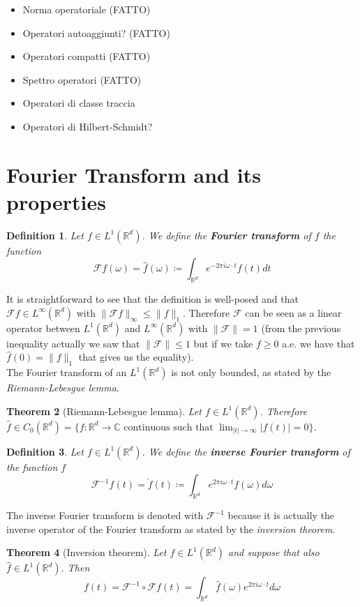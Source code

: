 \documentclass[corpo=11pt, stile=classica, tipotesi=custom,
greek, evenboxes, english]{toptesi}
\numberwithin{equation}{chapter}
\newtheorem{teo}{Theorem}[chapter] %
\newtheorem{defi}[teo]{Definition}
\theoremstyle{remark}
\newcommand{\R}{\mathbb{R}} %
\newcommand{\F}{\mathscr{F}} %
\newcommand{\C}{\mathbb{C}} %
\begin{document}
\begin{itemize}
	\item Norma operatoriale (FATTO)
	\item Operatori autoaggiunti? (FATTO)
	\item Operatori compatti (FATTO)
	\item Spettro operatori (FATTO)
	\item Operatori di classe traccia
	\item Operatori di Hilbert-Schmidt?
\end{itemize}
\section{Fourier Transform and its properties}\label{section Fourier transform and its properties}
\begin{defi}\label{Fourier transform def}
	Let $f \in L^1(\R^d)$. We define the \textbf{Fourier transform} of $f$ the function
	\begin{equation}\label{Fourier transform formula}
		\F f(\omega) = \hat{f}(\omega) \coloneqq \int_{\R^d} e^{-2 \pi i \omega \cdot t} f(t) dt
	\end{equation}
\end{defi}
It is straightforward to see that the definition is well-posed and that $\F f \in L^{\infty}(\R^d)$ with $\|\F f\|_{\infty} \leq \| f \|_1$. Therefore $\F$ can be seen as a linear operator between $L^1(\R^d)$ and $L^{\infty}(\R^d)$ with $\| \F \| = 1$ (from the previous inequality actually we saw that $\| \F \| \leq 1$ but if we take $f \geq 0$ a.e. we have that $\hat{f}(0) = \| f \|_1$ that gives us the equality).\\
The Fourier transform of an $L^1(\R^d)$ is not only bounded, as stated by the \emph{Riemann-Lebesgue lemma}.
\begin{teo}[Riemann-Lebesgue lemma]\label{Riemann-Lebesgue lemma}
	Let $f \in L^1(\R^d)$. Therefore $\hat{f} \in C_0(\R^d) = \{f : \R^d \rightarrow \C \text{ continuous such that } \lim_{|t| \rightarrow \infty} |f(t)|=0\}$.
\end{teo}
\begin{defi}\label{inverse Fourier transform def}
	Let $f \in L^1(\R^d)$. We define the \textbf{inverse Fourier transform} of the function $f$
	\begin{equation}\label{inverse Fourier transform formula}
		\F^{-1} f(t) = \check{f}(t) \coloneqq \int_{\R^d} e^{2 \pi i \omega \cdot t} f(\omega) d\omega
	\end{equation}
\end{defi}
The inverse Fourier transform is denoted with $\F^{-1}$ because it is actually the inverse operator of the Fourier transform as stated by the \emph{inversion theorem}.
\begin{teo}[Inversion theorem]\label{inversion theorem}
	Let $f \in L^1(\R^d)$ and suppose that also $\hat{f} \in L^1(\R^d)$. Then
	\begin{equation*}
		f(t) = \F^{-1} \circ \F f(t) = \int_{\R^d} \hat{f}(\omega) e^{2 \pi i \omega \cdot t}d\omega
	\end{equation*}
\end{teo}
\end{document}
